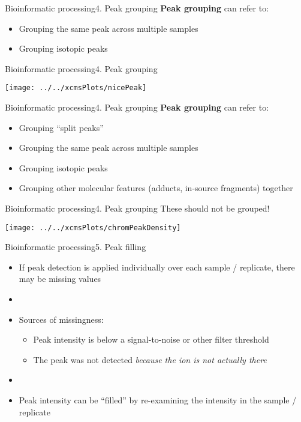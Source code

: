 \documentclass[xcolor=dvipsnames]{beamer}
\begin{document}
\begin{frame}{Bioinformatic processing}{4. Peak grouping}
\vspace{-7pt}
\textbf{Peak grouping} can refer to: \pause
		\begin{itemize}
			\item Grouping the same peak across multiple samples \pause
			\item Grouping isotopic peaks 
		\end{itemize}
\end{frame}

\begin{frame}{Bioinformatic processing}{4. Peak grouping}
\vspace{-10pt}
\begin{center}
	\texttt{[image: ../../xcmsPlots/nicePeak]}
\end{center}
\end{frame}

\begin{frame}{Bioinformatic processing}{4. Peak grouping}
\vspace{-7pt}
\textbf{Peak grouping} can refer to:
\begin{itemize}
	\item Grouping ``split peaks''
	\item Grouping the same peak across multiple samples
	\item Grouping isotopic peaks 
	\item Grouping other molecular features (adducts, in-source fragments) together
\end{itemize}
\end{frame}

\begin{frame}{Bioinformatic processing}{4. Peak grouping}
These should not be grouped!
	\begin{center}
		\texttt{[image: ../../xcmsPlots/chromPeakDensity]}
	\end{center}
\end{frame}

\begin{frame}{Bioinformatic processing}{5. Peak filling}
	\begin{itemize}
		\item If peak detection is applied individually over each sample / replicate, there may be missing values \pause
		\item[]
		\item Sources of missingness: \pause
		\begin{itemize}
			\item Peak intensity is below a signal-to-noise or other filter threshold \pause
			\item The peak was not detected \emph{because the ion is not actually there} \pause
		\end{itemize}
		\item[]
		\item Peak intensity can be ``filled'' by re-examining the intensity in the sample / replicate 
	\end{itemize}
\end{frame}
\end{document}
